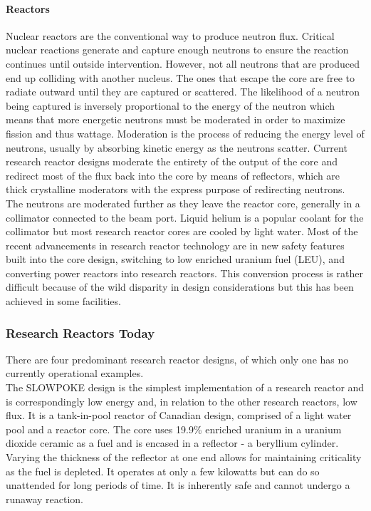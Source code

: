 \paragraph{Reactors}
Nuclear reactors are the conventional way to produce neutron flux. Critical nuclear reactions generate and capture enough neutrons to ensure the reaction continues until outside intervention. However, not all neutrons that are produced end up colliding with another nucleus. The ones that escape the core are free to radiate outward until they are captured or scattered. The likelihood of a neutron being captured is inversely proportional to the energy of the neutron which means that more energetic neutrons must be moderated in order to maximize fission and thus wattage. Moderation is the process of reducing the energy level of neutrons, usually by absorbing kinetic energy as the neutrons scatter. Current research reactor designs moderate the entirety of the output of the core and redirect most of the flux back into the core by means of reflectors, which are thick crystalline moderators with the express purpose of redirecting neutrons. The neutrons are moderated further as they leave the reactor core, generally in a collimator connected to the beam port. Liquid helium is a popular coolant for the collimator but most research reactor cores are cooled by light water. Most of the recent advancements in research reactor technology are in new safety features built into the core design, switching to low enriched uranium fuel (LEU), and converting power reactors into research reactors. This conversion process is rather difficult because of the wild disparity in design considerations but this has been achieved in some facilities.

\subsubsection{Research Reactors Today}

There are four predominant research reactor designs, of which only one has no currently operational examples.\\

The SLOWPOKE design is the simplest implementation of a research reactor and is correspondingly low energy and, in relation to the other research reactors, low flux. It is a tank-in-pool reactor of Canadian design, comprised of a light water pool and a reactor core. The core uses 19.9\% enriched uranium in a uranium dioxide ceramic as a fuel and is encased in a reflector - a beryllium cylinder. Varying the thickness of the reflector at one end allows for maintaining criticality as the fuel is depleted. It operates at only a few kilowatts but can do so unattended for long periods of time. It is inherently safe and cannot undergo a runaway reaction.\\

